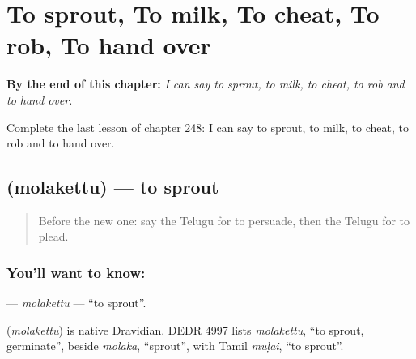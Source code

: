 
\chapter{To sprout, To milk, To cheat, To rob, To hand over}
\label{ch:te-to-sprout-to-milk-to-cheat-to-rob-to-hand-over}

\begin{chapteropening}
\textbf{By the end of this chapter:} \emph{I can say to sprout, to milk, to cheat, to rob and to hand over.}

Complete the last lesson of chapter 248: I can say to sprout, to milk, to cheat, to rob and to hand over.
\end{chapteropening}

\section[\texorpdfstring{\te{మొలకెత్తు} (molakettu)}{మొలకెత్తు (molakettu)}]{ (molakettu) — to sprout}

\label{lesson:TE-C248-molakettu}



\begin{quote}
Before the new one: say the Telugu for to persuade, then the Telugu for to plead.
\end{quote}

\subsection*{You'll want to know: }
\textbf{} — \emph{molakettu} — \textquotedblleft{}to sprout\textquotedblright{}.

\begin{cousinweb}
\textbf{} (\emph{molakettu}) is native Dravidian. DEDR 4997 lists \emph{molakettu}, \textquotedblleft{}to sprout, germinate\textquotedblright{}, beside \emph{molaka}, \textquotedblleft{}sprout\textquotedblright{}, with Tamil \emph{muḷai}, \textquotedblleft{}to sprout\textquotedblright{}.
\end{cousinweb}

